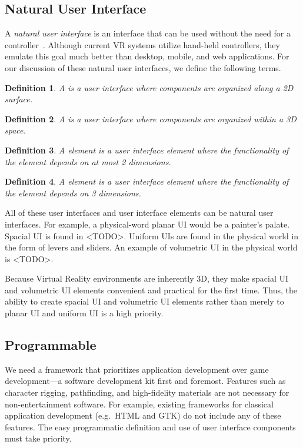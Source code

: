 \documentclass[conference,12pt]{IEEEtran}
\newtheorem{definition}{Definition}
\begin{document}
\subsection{Natural User Interface}
A \textit{natural user interface} is an interface that can be used without the
need for a controller~\cite{Wimmers:2015:VR:Natural-UI}. Although current VR
systems utilize hand-held controllers, they emulate this goal much better than
desktop, mobile, and web applications. For our discussion of these natural user
interfaces, we define the following terms.

\begin{definition}
    A {\normalfont{}} is a user interface where components are
    organized along a 2D surface.
\end{definition}

\begin{definition}
    A {\normalfont{}} is a user interface where components are
    organized within a 3D space.
\end{definition}

\begin{definition}
    A {\normalfont{}} element is a user interface element where
    the functionality of the element depends on at most 2 dimensions.
\end{definition}

\begin{definition}
    A {\normalfont{}} element is a user interface element
    where the functionality of the element depends on 3 dimensions.
\end{definition}

All of these user interfaces and user interface elements can be natural user
interfaces. For example, a physical-word planar UI would be a painter's palate.
Spacial UI is found in <TODO>.  Uniform UIs are found in the physical world in
the form of levers and sliders. An example of volumetric UI in the physical
world is <TODO>.

Because Virtual Reality environments are inherently 3D, they make spacial UI and
volumetric UI elements convenient and practical for the first time. Thus, the
ability to create spacial UI and volumetric UI elements rather than merely to
planar UI and uniform UI is a high priority.

\subsection{Programmable}
We need a framework that prioritizes application development over game
development---a software development kit first and foremost. Features such as
character rigging, pathfinding, and high-fidelity materials are not necessary
for non-entertainment software. For example, existing frameworks for classical
application development (e.g.\ HTML and GTK) do not include any of these
features. The easy programmatic definition and use of user interface components
must take priority.
\end{document}
